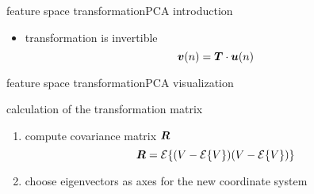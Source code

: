 \begin{frame}{feature space transformation}{PCA introduction}
\begin{itemize}
\begin{itemize}
                                \begin{equation*}
                                    \vec{c}_i^\mathrm{T}\cdot \vec{c}_j = 0\quad \forall\enspace i \neq j
                                \end{equation*}
                        \item<2->	transformation is invertible
                                \begin{equation*}\label{eq:pca_syn}
                                    \vec{v}(n) = \mat{T}\cdot\vec{u}(n)
                                \end{equation*}
                    \end{itemize}
            \end{itemize}
		\end{frame}
		\begin{frame}{feature space transformation}{PCA visualization}
			\vspace{-3mm}
			
			\vspace{-5mm}
			\pause
			calculation of the transformation matrix
			\begin{enumerate}
				\item	compute covariance matrix $\mat{R}$
                    \begin{equation*}
						\mat{R} = \mathcal{E}\lbrace(V-\mathcal{E}\lbrace V\rbrace)(V-\mathcal{E}\lbrace V\rbrace)\rbrace%
					\end{equation*}
				\item	choose eigenvectors as axes for the new coordinate system
			\end{enumerate}
		\end{frame}

